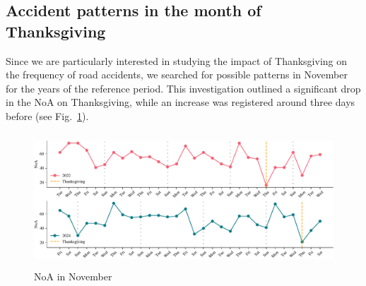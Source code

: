 \documentclass{article}
\begin{document}
\subsection{Accident patterns in the month of Thanksgiving}
Since we are particularly interested in studying the impact of Thanksgiving on
the frequency of road accidents, we searched for possible patterns in November
for the years of the reference period. This investigation outlined a significant
drop in the NoA on Thanksgiving, while an increase was registered around three
days before (see Fig.~\ref{fig:accidents_per_day}).
\begin{figure}[H]
  \centering
    \includegraphics[height=5cm]{../fig/accidents_per_day.pdf}
    \caption{NoA in November}\label{fig:accidents_per_day}
\end{figure}
\end{document}
